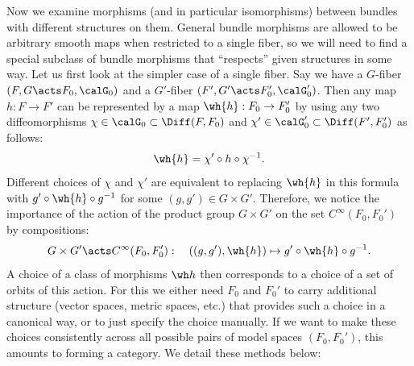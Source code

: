 Now we examine morphisms (and in particular isomorphisms) between bundles with different structures on them. General bundle morphisms are allowed to be arbitrary smooth maps when restricted to a single fiber, so we will need to find a special subclass of bundle morphisms that ``respects'' given structures in some way. Let us first look at the simpler case of a single fiber. Say we have a $G$-fiber $(F,G\acts F_0,\calG_0)$ and a $G'$-fiber $(F',G'\acts F_0',\calG_0')$. Then any map $h:F\to F'$ can be represented by a map $\wh{h}:F_0\to F_0'$ by using any two diffeomorphisms $\chi\in\calG_0\subset \Diff(F,F_0)$ and $\chi'\in\calG_0'\subset \Diff(F',F_0')$ as follows:
\[\wh{h}=\chi'\circ h\circ \chi^{-1}.\label{eq g-fiber f-hat}\]
Different choices of $\chi$ and $\chi'$ are equivalent to replacing $\wh{h}$ in this formula with $g'\circ \wh{h}\circ g^{-1}$ for some $(g,g')\in G\times G'$. Therefore, we notice the importance of the action of the product group $G\times G'$ on the set $C^\infty(F_0,F_0')$ by compositions:
\[G\times G'\acts C^\infty(F_0,F_0'):\quad ((g,g'),\wh{h})\mapsto g'\circ \wh{h}\circ g^{-1}.\label{eq gg' action}\] 
A choice of a class of morphisms $\wh h$ then corresponds to a choice of a set of orbits of this action. For this we either need $F_0$ and $F_0'$ to carry additional structure (vector spaces, metric spaces, etc.) that provides such a choice in a canonical way, or to just specify the choice manually. If we want to make these choices consistently across all possible pairs of model spaces $(F_0,F_0')$, this amounts to forming a category. We detail these methods below:
